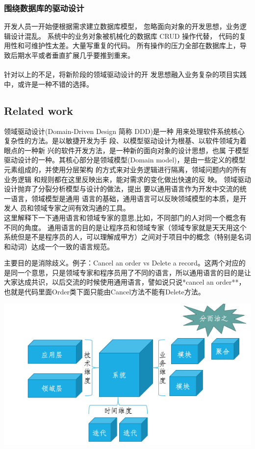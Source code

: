 \documentclass[journal]{IEEEtran}
\begin{document}
\begin{CJK*}{UTF8}{gbsn}
\subsubsection {围绕数据库的驱动设计}
开发人员一开始便根据需求建立数据库模型， 忽略面向对象的开发思想，业务逻辑设计混乱。
系统中的业务对象被机械化的数据库 CRUD 操作代替， 
代码的复用性和可维护性太差。大量写重复的代码。
所有操作的压力全部在数据库上，导致后期水平或者垂直扩展几乎要推到重来。
\\
\\ 针对以上的不足，将新阶段的领域驱动设计的开
发思想融入业务复杂的项目实践中，或许是一种不错的选择。




\subsection{Related work}
  领域驱动设计(Domain-Driven Design 简称 DDD)是一种
用来处理软件系统核心复杂性的方法。是以敏捷开发为手
段、以模型驱动设计为根基、以软件领域为着眼点的一种新
兴的软件开发方法，是一种新的面向对象的设计思想，也属
于模型驱动设计的一种。其核心部分是领域模型(Domain
model)，是由一些定义的模型元素组成的，并使用分层架构
的方式来对业务逻辑进行隔离，领域问题内的所有业务逻辑
和规则都在这里反映出来，能对需求的变化做出快速的反
映。
\newline
\indent
  领域驱动设计抛弃了分裂分析模型与设计的做法，提出
要以通用语言作为开发中交流的统一语言，领域模型是通用
语言的基础，通用语言可以反映领域模型的本质，是开发人
员和领域专家之间有效沟通的工具。
\\

这里解释下一下通用语言和领域专家的意思,比如，不同部门的人对同一个概念有不同的角度。
通用语言的目的是让程序员和领域专家（领域专家就是天天用这个系统但是不是程序员的人，可以理解成甲方）之间对于项目中的概念（特别是名词和动词）达成一个一致的语言规范。

主要目的是消除歧义。例子：Cancel an order vs Delete a record。这两个对应的是同一个意思，只是领域专家和程序员用了不同的语言，所以通用语言的目的是让大家达成共识，以后交流的时候使用通用语言，譬如说只说*cancel an order**，也就是代码里面Order类下面只能由Cancel方法不能有Delete方法。

\includegraphics[scale=0.4]{2.png}

\end{CJK*}
\end{document}
